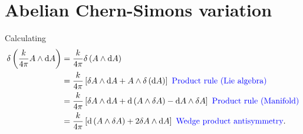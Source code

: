 \documentclass{article}
\begin{document}
\section{Abelian Chern-Simons variation}
\label{appendixabelianchernsimonsvariation}
Calculating
\begin{align}
    \delta\left(\frac{k}{4\pi}A\wedge \mathrm{d} A \right) &= \frac{k}{4\pi}\delta\left(A\wedge \mathrm{d}A\right)\nonumber\\
    &= \frac{k}{4\pi}\left[\delta A \wedge \mathrm{d}A + A\wedge \delta\left(\mathrm{d}A\right)\right]\color{blue}\text{ Product rule (Lie algebra)}\color{black}\nonumber\\
    &= \frac{k}{4\pi}\left[\delta A \wedge \mathrm{d}A + \mathrm{d}\left(A\wedge \delta A\right)-\mathrm{d}A\wedge \delta A\right]\color{blue}\text{ Product rule (Manifold)}\color{black}\nonumber\\
    &= \frac{k}{4\pi}\left[\mathrm{d}\left(A\wedge \delta A \right) + 2\delta A \wedge \mathrm{d}A\right] \color{blue}\text{ Wedge product antisymmetry}\color{black}.\nonumber 
\end{align}
\end{document}
